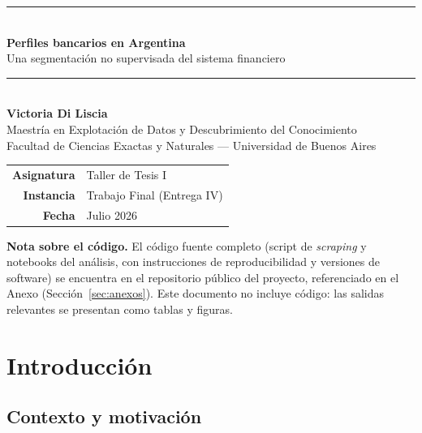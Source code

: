 \documentclass[11pt,a4paper]{article}
\begin{document}
\begin{titlepage}
\centering
\vspace*{3cm}
{\color{azultesis}\rule{\textwidth}{1.2pt}}\\[0.4cm]
{\Huge\bfseries\color{azultesis} Perfiles bancarios en Argentina}\\[0.3cm]
{\Large\color{rojotesis} Una segmentación no supervisada del sistema financiero}\\[0.3cm]
{\color{azultesis}\rule{\textwidth}{1.2pt}}\\[1.5cm]

{\large\bfseries Victoria Di Liscia}\\[0.6cm]
{Maestría en Explotación de Datos y Descubrimiento del Conocimiento}\\
{Facultad de Ciencias Exactas y Naturales --- Universidad de Buenos Aires}\\[1.5cm]

\begin{tabular}{rl}
\textbf{Asignatura} & Taller de Tesis I\\
\textbf{Instancia} & Trabajo Final (Entrega IV)\\
\textbf{Fecha} & Julio 2026\\
\end{tabular}

\vfill
\begin{notebox}
\small
\textbf{Nota sobre el código.} El código fuente completo (script de \textit{scraping} y
notebooks del análisis, con instrucciones de reproducibilidad y versiones de software)
se encuentra en el repositorio público del proyecto, referenciado en el Anexo (Sección~\ref{sec:anexos}).
Este documento no incluye código: las salidas relevantes se presentan como tablas y figuras.
\end{notebox}
\end{titlepage}

\tableofcontents
\newpage

\section{Introducción}

\subsection{Contexto y motivación}
\end{document}
